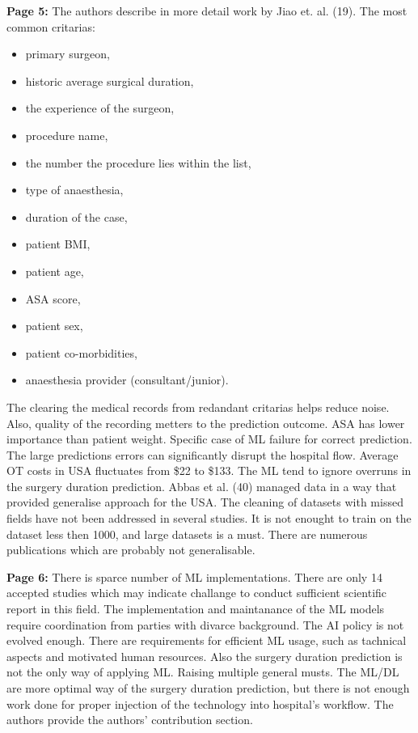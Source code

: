     \textbf{Page 5:}
    The authors describe in more detail work by Jiao et. al. (19). The most common critarias: 
    \begin{itemize}
        \item primary surgeon, 
        \item historic average surgical duration, 
        \item the experience of the surgeon, 
        \item procedure name, 
        \item the number the procedure lies within the list, 
        \item type of anaesthesia,
        \item duration of the case, 
        \item patient BMI, 
        \item patient age, 
        \item ASA score, 
        \item patient sex, 
        \item patient co-morbidities,
        \item anaesthesia provider (consultant/junior).
    \end{itemize}
    The clearing the medical records from redandant critarias helps reduce noise. Also, quality of the recording metters to the prediction outcome. ASA has lower importance than patient weight. Specific case of ML failure for correct prediction. The large predictions errors can significantly disrupt the hospital flow. Average OT costs in USA fluctuates from \$22 to \$133. The ML tend to ignore overruns in the surgery duration prediction. Abbas et al. (40) managed data in a way that provided generalise approach for the USA. The cleaning of datasets with missed fields have not been addressed in several studies. It is not enought to train on the dataset less then 1000, and large datasets is a must. There are numerous publications which are probably not generalisable.
    
    \textbf{Page 6:}
    There is sparce number of ML implementations. There are only 14 accepted studies which may indicate challange to conduct sufficient scientific report in this field. The implementation and maintanance of the ML models require coordination from parties with divarce background. The AI policy is not evolved enough. There are requirements for efficient ML usage, such as tachnical aspects and motivated human resources. Also the surgery duration prediction is not the only way of applying ML. Raising multiple general musts. The ML/DL are more optimal way of the surgery duration prediction, but there is not enough work done for proper injection of the technology into hospital's workflow. The authors provide the authors' contribution section.